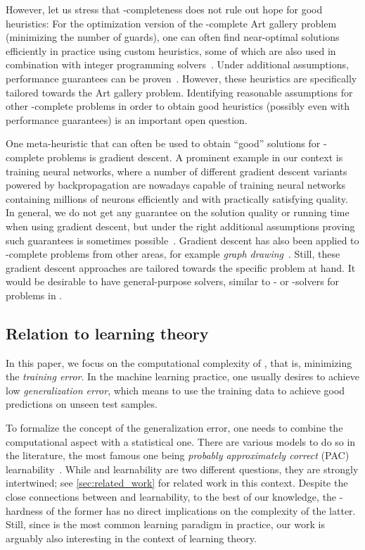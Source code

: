 However, let us stress that \ER-completeness does not rule out hope for good heuristics:
%
%
%
%
%
%
%
%
%
%
For the optimization version of the \ER-complete Art gallery problem (minimizing the number
of guards),  %
one can often find near-optimal solutions efficiently in practice
using custom heuristics, some of which are also used in combination with integer programming
solvers~\cite{Rezende2016_ArtGalleries}.
Under additional assumptions, performance guarantees can be proven~\cite{Hengeveld2021_ArtGallery}.
However, these heuristics are specifically tailored towards the Art gallery problem.
Identifying reasonable assumptions for other \ER-complete problems in order to obtain
good heuristics (possibly even with performance guarantees) is an important open question.

One meta-heuristic that can %
often be used   %
%
to obtain  %
\enquote{good} solutions for \ER-complete
problems is gradient descent.  
A prominent example in our context is training neural networks, where
%
a number of  %
different gradient descent variants powered by backpropagation are nowadays capable 
of training neural networks containing millions of neurons
%
efficiently and with practically satisfying quality.
%
%
%
%
%
%
%
%
In general, we do not get any guarantee on the solution quality or running time
%
when using gradient descent, but under the right additional assumptions proving such guarantees is sometimes possible~\cite{Brutzkus2017_OptimalGD}.
Gradient descent has also been applied to \ER-complete problems from other areas, for example \emph{graph drawing}~\cite{Ahmed2022_GraphDrawingGD}.
Still, these gradient descent approaches are tailored towards the specific problem at hand.
It would be %
%
desirable to have 
%
general-purpose   %
solvers, similar to \SAT- or \MIP-solvers for problems in \NP.

\subsection{Relation to learning theory}
In this paper, we %
focus on the computational complexity of \ERM, that is, minimizing the \emph{training error}.
In the machine learning practice, one usually desires to achieve low \emph{generalization error}, which means to use the training data to achieve good predictions on unseen test samples.

To formalize the concept of the generalization error, one needs to combine the computational
aspect with a statistical one.
There are various models to do so in the literature, the most famous one being 
\emph{probably approximately correct} (PAC) learnability~\cite{Shalev2014_UnderstandingML,Valiant1984_Theory}.
%
%
%
%
While \ERM and learnability are two different questions, they are strongly intertwined; see \cref{sec:related_work} for related work in this context.
Despite the close connections between \ERM and learnability, to the best of our knowledge, the \ER-hardness of the former has no direct implications on the complexity of the latter.
Still, since \ERM is the most common learning paradigm in practice, our work is arguably also interesting in the context of learning theory.

